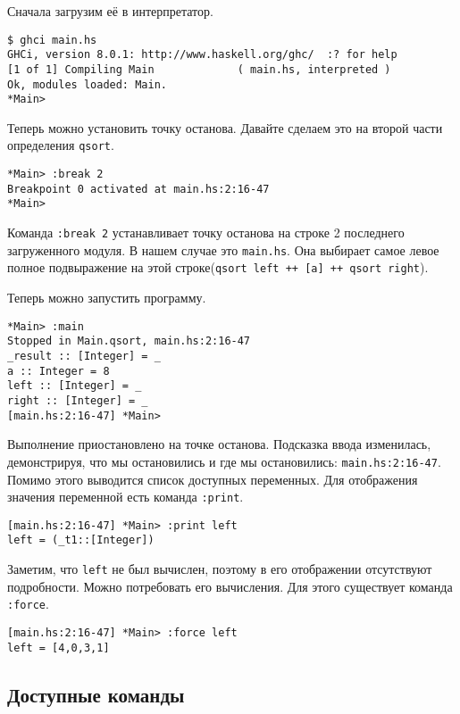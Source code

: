 \documentclass[14pt]{extarticle}
\def\code#1{\texttt{#1}}
\begin{document}
Сначала загрузим её в интерпретатор.

\begin{lstlisting}
$ ghci main.hs
GHCi, version 8.0.1: http://www.haskell.org/ghc/  :? for help
[1 of 1] Compiling Main             ( main.hs, interpreted )
Ok, modules loaded: Main.
*Main>
\end{lstlisting}

Теперь можно установить точку останова. Давайте сделаем это на второй части
определения \code{qsort}.

\begin{lstlisting}
*Main> :break 2
Breakpoint 0 activated at main.hs:2:16-47
*Main>
\end{lstlisting}

Команда \code{:break 2} устанавливает точку останова на строке 2 последнего
загруженного модуля. В нашем случае это \code{main.hs}. Она выбирает самое
левое полное подвыражение на этой строке(\code{qsort left ++ [a] ++ qsort
right}).

Теперь можно запустить программу.

\begin{lstlisting}
*Main> :main
Stopped in Main.qsort, main.hs:2:16-47
_result :: [Integer] = _
a :: Integer = 8
left :: [Integer] = _
right :: [Integer] = _
[main.hs:2:16-47] *Main> 
\end{lstlisting}

Выполнение приостановлено на точке останова. Подсказка ввода изменилась,
демонстрируя, что мы остановились и где мы остановились:
\code{main.hs:2:16-47}. Помимо этого выводится список доступных переменных.
Для отображения значения переменной есть команда \code{:print}.

\begin{lstlisting}
[main.hs:2:16-47] *Main> :print left
left = (_t1::[Integer])
\end{lstlisting}

Заметим, что \code{left} не был вычислен, поэтому в его отображении отсутствуют
подробности. Можно потребовать его вычисления. Для этого существует команда
\code{:force}.

\begin{lstlisting}
[main.hs:2:16-47] *Main> :force left
left = [4,0,3,1]
\end{lstlisting}

\subsection{Доступные команды}
\end{document}
